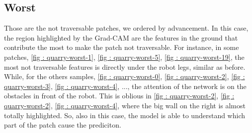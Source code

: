 \documentclass[../document.tex]{subfiles}
\begin{document}
\subsection{Worst}
Those are the not traversable patches, we ordered by advancement. In this case, the region highlighted by the Grad-CAM are the features in the ground that contribute the most to make the patch not traversable. For instance, in some patches, \ref{fig : quarry-worst-1}, \ref{fig : quarry-worst-5}, \ref{fig : quarry-worst-19}, the most not traversable features is directly under the robot legs, similar as before. While, for the others samples, \ref{fig : quarry-worst-0}, \ref{fig : quarry-worst-2}, \ref{fig : quarry-worst-3}, \ref{fig : quarry-worst-4}, ..., the attention of the network is on the obstacles in front of the robot. This is oblious in  \ref{fig : quarry-worst-2}, \ref{fig : quarry-worst-2}, \ref{fig : quarry-worst-4}, where the big wall on the right is almost totally highlighted. So, also in this case, the model is able to understand which part of the patch cause the prediciton. 
\end{document}
